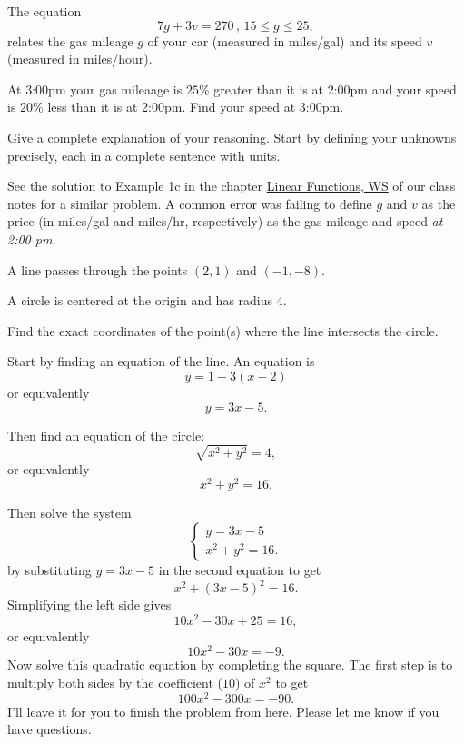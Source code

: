\documentclass{ximera}
\begin{document}
\begin{question} \label{Qmvcw21zaq}
The equation
\[
    7g + 3v = 270 \, , \, 15\leq g \leq 25,
\]
relates the gas mileage $g$ of your car (measured in miles/gal) and its speed $v$ (measured in miles/hour).

At 3:00pm your gas mileaage is $25\%$ greater than it is at 2:00pm and your speed is $20\%$ less than it is at 2:00pm. Find your speed at 3:00pm.

Give a complete explanation of your reasoning. Start by defining your unknowns precisely, each in a complete sentence with units.

\end{question}

\begin{explanation}
See the solution to Example 1c in the chapter \href{https://ximera.osu.edu/precalc1/PreCalculus1/LinearFunctionsWS/LinearFunctionsWS}{Linear Functions, WS} of our class notes for a similar problem. A common error was failing to define $g$ and $v$ as the price (in miles/gal and miles/hr, respectively) as the gas mileage and speed \emph{at 2:00 pm}.
\end{explanation}

\begin{question} \label{Q0f03fffffe}
 A line passes through the points $(2,1)$ and $(-1,-8)$.

A circle is centered at the origin and has radius $4$.

Find the exact coordinates of the point(s) where the line intersects the circle. 

\begin{explanation}
Start by finding an equation of the line. An equation is
\[
     y = 1 + 3(x-2)
\]
or equivalently
\[
     y = 3x - 5.
\]

Then find an equation of the circle:
\[
   \sqrt{x^2 + y^2} = 4,
\]
or equivalently
\[
    x^2 + y^2 = 16.
\]

Then solve the system
\[
 \begin{cases}
      y = 3x - 5 \\
      x^2 + y^2 = 16.
\end{cases}
\]
by substituting $y=3x-5$ in the second equation to get
\[
     x^2 + (3x-5)^2 = 16.
\]
Simplifying the left side gives
\[
  10x^2 - 30x + 25 = 16,
\]
or equivalently
\[
 10x^2 - 30x = -9.
\]
Now solve this quadratic equation by completing the square. The first step is to multiply both sides by the coefficient ($10$) of $x^2$ to get
\[
    100x^2 - 300x = -90.
\]
I'll leave it for you to finish the problem from here. Please let me know if you have questions.
\end{explanation}
\end{question}
\end{document}
